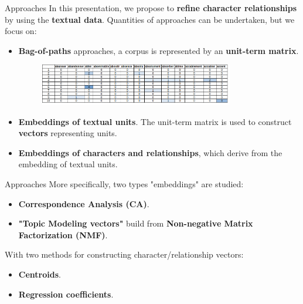 \documentclass[10pt]{beamer}
\newcommand{\imp}[1]{\textbf{\color{cyan}#1}}
\begin{document}
	
	
	\begin{frame}{Approaches}
		In this presentation, we propose to \imp{refine character relationships} by using the \imp{textual data}. Quantities of approaches can be undertaken, but we focus on:
		\begin{itemize}
			\item \imp{Bag-of-paths} approaches, a corpus is represented by an \imp{unit-term matrix}. \\
			\vspace{0.3cm}
			\begin{figure}
				\centering
				\includegraphics[width=0.8\textwidth]{img/unit_term.png}
			\end{figure}
			\item \imp{Embeddings of textual units}. The unit-term matrix is used to construct \imp{vectors} representing units. 
			\item \imp{Embeddings of characters and relationships}, which derive from the embedding of textual units.
		\end{itemize}
	\end{frame}
	
	
	
	\begin{frame}{Approaches}
		More specifically, two types "embeddings" are studied:
		\begin{itemize}
			\item \imp{Correspondence Analysis (CA)}.
			\item \imp{"Topic Modeling vectors"} build from \imp{Non-negative Matrix Factorization (NMF)}.
		\end{itemize}
		With two methods for constructing character/relationship vectors:
		\begin{itemize}
			\item \imp{Centroids}.
			\item \imp{Regression coefficients}.
		\end{itemize}
	\end{frame}
	
	
	
\end{document}
